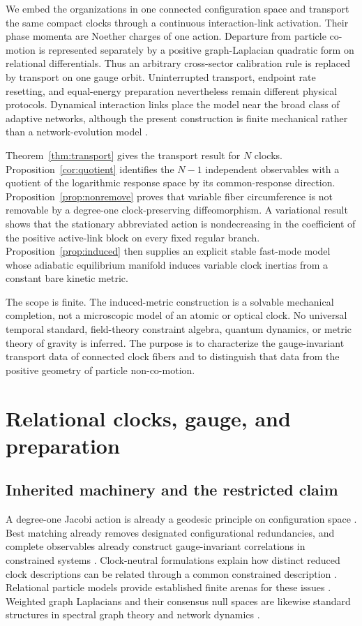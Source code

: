 \documentclass[11pt]{article}
\theoremstyle{plain}
\begin{document}
We embed the organizations in one connected configuration space and transport
the same compact clocks through a continuous interaction-link activation.
Their phase momenta are Noether charges of one action.  Departure from particle
co-motion is represented separately by a positive graph-Laplacian quadratic
form on relational differentials.  Thus an arbitrary cross-sector calibration
rule is replaced by transport on one gauge orbit.  Uninterrupted transport,
endpoint rate resetting, and equal-energy preparation nevertheless remain
different physical protocols.  Dynamical interaction links place the model
near the broad class of adaptive networks, although the present construction
is finite mechanical rather than a network-evolution model
\cite{GrossBlasius}.

Theorem~\ref{thm:transport} gives the transport result for $N$ clocks.
Proposition~\ref{cor:quotient} identifies the $N-1$ independent observables with
a quotient of the logarithmic response space by its common-response direction.
Proposition~\ref{prop:nonremove} proves that variable fiber circumference is
not removable by a degree-one clock-preserving diffeomorphism.  A variational
result shows that the stationary abbreviated action is nondecreasing in the
coefficient of the positive active-link block on every fixed regular branch.
Proposition~\ref{prop:induced} then supplies an explicit stable fast-mode model
whose adiabatic equilibrium manifold induces variable clock inertias from a
constant bare kinetic metric.

The scope is finite.  The induced-metric construction is a solvable mechanical
completion, not a microscopic model of an atomic or optical clock.  No
universal temporal standard, field-theory constraint algebra, quantum dynamics,
or metric theory of gravity is inferred.  The purpose is to characterize the
gauge-invariant transport data of connected clock fibers and to distinguish
that data from the positive geometry of particle non-co-motion.

\section{Relational clocks, gauge, and preparation}

\subsection{Inherited machinery and the restricted claim}

A degree-one Jacobi action is already a geodesic principle on configuration space \cite{Arnold}. Best matching already removes designated configurational redundancies, and complete observables already construct gauge-invariant correlations in constrained systems \cite{Dittrich2006,Dittrich2007}. Clock-neutral formulations explain how distinct reduced clock descriptions can be related through a common constrained description \cite{HohnVanrietvelde,HohnTrinity}. Relational particle models provide established finite arenas for these issues \cite{AndersonRPM}. Weighted graph Laplacians and their consensus null spaces are likewise standard structures in spectral graph theory and network dynamics \cite{Chung,OlfatiSaber}.
\end{document}
